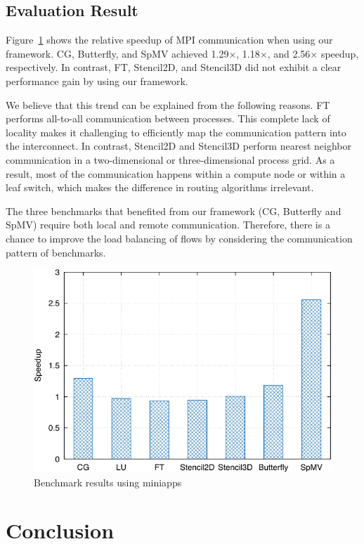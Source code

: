 \documentclass[graybox]{svmult}
\begin{document}
\subsection{Evaluation Result}

Figure~\ref{kt:fig:benchmark} shows the relative speedup of MPI communication
when using our framework. CG, Butterfly, and SpMV achieved 1.29$\times$,
1.18$\times$, and 2.56$\times$ speedup, respectively. In contrast, FT,
Stencil2D, and Stencil3D did not exhibit a clear performance gain by using our
framework.

We believe that this trend can be explained from the following reasons. FT
performs all-to-all communication between processes. This complete lack of
locality makes it challenging to efficiently map the communication pattern
into the interconnect. In contrast, Stencil2D and Stencil3D perform nearest
neighbor communication in a two-dimensional or three-dimensional process grid.
As a result, most of the communication happens within a compute node or within
a leaf switch, which makes the difference in routing algorithms irrelevant.

The three benchmarks that benefited from our framework (CG, Butterfly and
SpMV) require both local and remote communication. Therefore, there is a
chance to improve the load balancing of flows by considering the communication
pattern of benchmarks.

\begin{figure}
    \centering
    \includegraphics{benchmark_result}
    \caption{Benchmark results using miniapps}%
    \label{kt:fig:benchmark}
\end{figure}

\section{Conclusion}\label{kt:sec:v}
\end{document}
